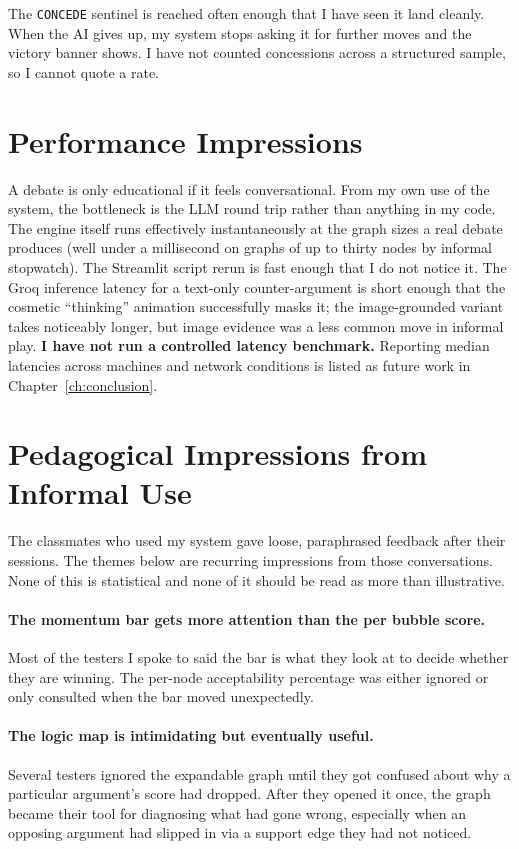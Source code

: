 The \texttt{CONCEDE} sentinel is reached often enough that I have seen it land cleanly. When the AI gives up, my system stops asking it for further moves and the victory banner shows. I have not counted concessions across a structured sample, so I cannot quote a rate.

\section{Performance Impressions}
\label{sec:eval_perf}
A debate is only educational if it feels conversational. From my own use of the system, the bottleneck is the LLM round trip rather than anything in my code. The engine itself runs effectively instantaneously at the graph sizes a real debate produces (well under a millisecond on graphs of up to thirty nodes by informal stopwatch). The Streamlit script rerun is fast enough that I do not notice it. The Groq inference latency for a text-only counter-argument is short enough that the cosmetic ``thinking'' animation successfully masks it; the image-grounded variant takes noticeably longer, but image evidence was a less common move in informal play. \textbf{I have not run a controlled latency benchmark.} Reporting median latencies across machines and network conditions is listed as future work in Chapter~\ref{ch:conclusion}.

\section{Pedagogical Impressions from Informal Use}
\label{sec:eval_pedagogical}
The classmates who used my system gave loose, paraphrased feedback after their sessions. The themes below are recurring impressions from those conversations. None of this is statistical and none of it should be read as more than illustrative.

\paragraph{The momentum bar gets more attention than the per bubble score.}
Most of the testers I spoke to said the bar is what they look at to decide whether they are winning. The per-node acceptability percentage was either ignored or only consulted when the bar moved unexpectedly.

\paragraph{The logic map is intimidating but eventually useful.}
Several testers ignored the expandable graph until they got confused about why a particular argument's score had dropped. After they opened it once, the graph became their tool for diagnosing what had gone wrong, especially when an opposing argument had slipped in via a support edge they had not noticed.

